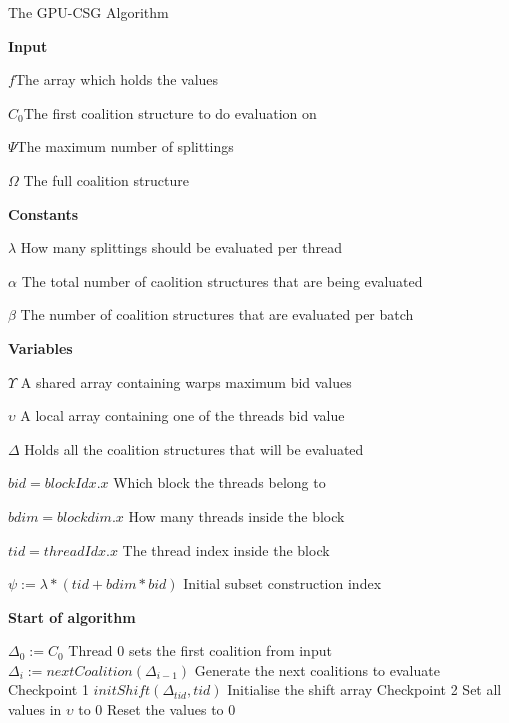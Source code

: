 \documentclass{llncs}
\begin{document}
\begin{algorithm}[!t]
\caption{The GPU-CSG Algorithm\label{gpudp}}
\textbf{Input}

$f$\hfill The array which holds the values

$C_0$\hfill The first coalition structure to do evaluation on

$\Psi$\hfill The maximum number of splittings

$\Omega$ \hfill The full coalition structure

\textbf{Constants}

$\lambda$ \hfill How many splittings should be evaluated per thread

$\alpha$ \hfill The total number of caolition structures that are being evaluated

$\beta$ \hfill The number of coalition structures that are evaluated per batch

\textbf{Variables} 

$\Upsilon$ \hfill A shared array containing warps maximum bid values

$\upsilon$ \hfill A local array containing one of the threads bid value

$\Delta$ \hfill Holds all the coalition structures that will be evaluated

$bid = blockIdx.x$ \hfill Which block the threads belong to



$bdim = blockdim.x$ \hfill How many threads inside the block

$tid = threadIdx.x$ \hfill The thread index inside the block

$\psi := \lambda*(tid+bdim*bid)$ \hfill Initial subset construction index

\textbf{Start of algorithm}
\begin{algorithmic}[1]
  \STATE $\Delta_0 := C_0$ \hfill Thread 0 sets the first coalition from input
    \STATE $\Delta_i := nextCoalition(\Delta_{i-1})$ \hfill Generate the next coalitions to evaluate
  \ENDFOR \hfill Checkpoint 1
\ENDIF
{}
  \STATE $initShift(\Delta_{tid},tid)$ \hfill Initialise the shift array
\ENDIF
\hfill Checkpoint 2
\label{lst:line:bigfetch}
  \STATE Set all values in $\upsilon$ to 0 \hfill Reset the values to 0


\end{algorithmic}
\end{algorithm}
\end{document}
